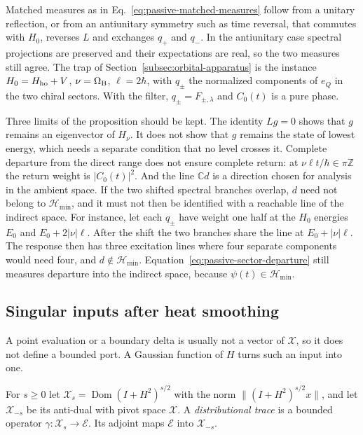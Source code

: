 \documentclass[11pt]{article}
\theoremstyle{definition}
\newcommand{\C}{\mathbb C}
\newcommand{\Hmin}{\mathcal H_{\min}}
\begin{document}
Matched measures as in Eq.~\eqref{eq:passive-matched-measures} follow from a unitary reflection, or from an antiunitary symmetry such as time reversal, that commutes with $H_0$, reverses $L$ and exchanges $q_+$ and $q_-$. In the antiunitary case spectral projections are preserved and their expectations are real, so the two measures still agree. The trap of Section~\ref{subsec:orbital-apparatus} is the instance $H_0=H_{\rm ho}+V$, $\nu=\Omega_{\rm B}$, $\ell=2\hbar$, with $q_\pm$ the normalized components of $e_Q$ in the two chiral sectors. With the filter, $q_\pm=F_{\pm,\lambda}$ and $C_0(t)$ is a pure phase.

Three limits of the proposition should be kept. The identity $Lg=0$ shows that $g$ remains an eigenvector of $H_\nu$. It does not show that $g$ remains the state of lowest energy, which needs a separate condition that no level crosses it. Complete departure from the direct range does not ensure complete return: at $\nu\ell t/\hbar\in\pi\mathbb Z$ the return weight is $|C_0(t)|^2$. And the line $\C d$ is a direction chosen for analysis in the ambient space. If the two shifted spectral branches overlap, $d$ need not belong to $\Hmin$, and it must not then be identified with a reachable line of the indirect space. For instance, let each $q_\pm$ have weight one half at the $H_0$ energies $E_0$ and $E_0+2|\nu|\ell$. After the shift the two branches share the line at $E_0+|\nu|\ell$. The response then has three excitation lines where four separate components would need four, and $d\notin\Hmin$. Equation~\eqref{eq:passive-sector-departure} still measures departure into the indirect space, because $\psi(t)\in\Hmin$.

\subsection{Singular inputs after heat smoothing}
\label{subsec:passive-heat}

A point evaluation or a boundary delta is usually not a vector of $\mathcal X$, so it does not define a bounded port. A Gaussian function of $H$ turns such an input into one.

For $s\ge0$ let $\mathcal X_s=\operatorname{Dom}(I+H^2)^{s/2}$ with the norm $\|(I+H^2)^{s/2}x\|$, and let $\mathcal X_{-s}$ be its anti-dual with pivot space $\mathcal X$. A \emph{distributional trace} is a bounded operator $\gamma:\mathcal X_s\to\mathcal E$. Its adjoint maps $\mathcal E$ into $\mathcal X_{-s}$.
\end{document}
